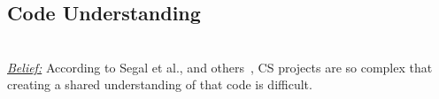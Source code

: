 \documentclass[sigconf,review,anonymous]{acmart}
\begin{document}








  
 
\subsection{Code Understanding} ~\\
\noindent \textit{\underline{Belief:}} According to
Segal et al., and others~\cite{segal07_problem, carver06_hpc, Shull05_parallel, sanders08_risk},
CS projects are so complex that creating
a shared understanding of that code is difficult. 

\newcommand{\varendash}[1][5pt]{%
  \makebox[#1]{\leaders\hbox{--}\hfill\kern0pt}%
}
\end{document}
